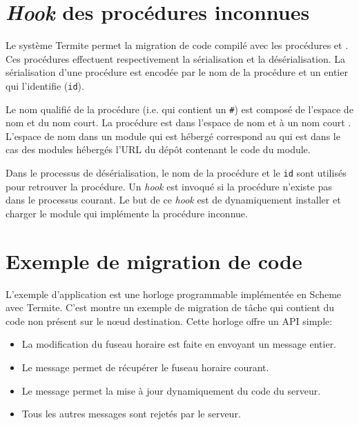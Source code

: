 \section{\textit{Hook} des procédures inconnues}
%
Le système Termite permet la migration de code compilé avec les procédures
 et . Ces procédures
effectuent respectivement la sérialisation et la désérialisation.
La sérialisation d'une procédure est encodée par le nom de la procédure et
un entier qui l'identifie (\texttt{id}).

Le nom qualifié de la procédure (i.e. qui contient un \texttt{\#}) est composé
de l'espace de nom et du nom court. La procédure  est
dans l'espace de nom  et à un nom court .
L'espace de nom dans un module qui est hébergé correspond au 
qui est dans le cas des modules hébergés l'URL du dépôt contenant
le code du module.

Dans le processus de désérialisation, le nom de la procédure et le \texttt{id}
sont utilisés pour retrouver la procédure. Un \textit{hook} est invoqué
si la procédure n'existe pas dans le processus courant. Le but de
ce \textit{hook} est de dynamiquement installer et charger le module 
qui implémente la procédure inconnue.

\section{Exemple de migration de code}

L'exemple d'application est une horloge programmable implémentée
en Scheme avec Termite. C'est montre un exemple de migration
de tâche qui contient du code non présent sur le nœud destination.
Cette horloge offre un API simple:
\begin{itemize}
  \item La modification du fuseau horaire est faite en envoyant
    un message entier.

  \item Le message  permet de récupérer
    le fuseau horaire courant.

  \item Le message  permet la mise à jour
    dynamiquement du code du serveur.

  \item Tous les autres messages sont rejetés par le serveur.
\end{itemize}

